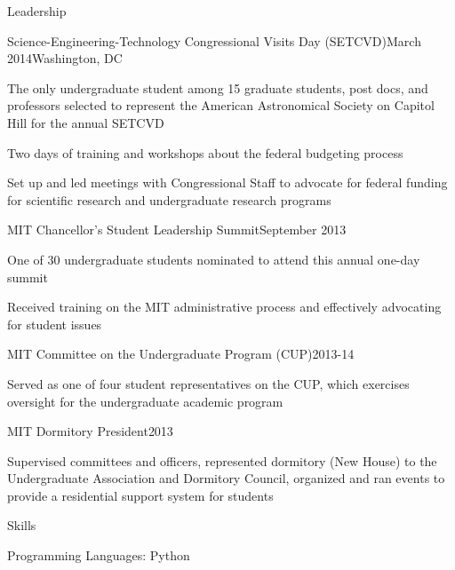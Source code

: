 \documentclass{resume} %
\begin{document}
\begin{rSection}{Leadership}

  \begin{rSubsection}{Science-Engineering-Technology Congressional Visits Day (SETCVD)}{March 2014}{}{Washington, DC}
  \item The only undergraduate student among 15 graduate students, post docs, and professors selected to represent the American Astronomical Society on Capitol Hill for the annual SETCVD
  \item Two days of training and workshops about the federal budgeting process 
  \item Set up and led meetings with Congressional Staff to advocate for federal funding for scientific research and undergraduate research programs
  \end{rSubsection}

\begin{rSubsection}{MIT Chancellor's Student Leadership Summit}{September 2013}{}{}
\item One of 30 undergraduate students nominated to attend this annual one-day summit
\item Received training on the MIT administrative process and effectively advocating for student issues 
\end{rSubsection}

\begin{rSubsection}{MIT Committee on the Undergraduate Program (CUP)}{2013-14}{}{}
\item Served as one of four student representatives on the CUP, which exercises oversight for the undergraduate academic program
\end{rSubsection}

\begin{rSubsection}{MIT Dormitory President}{2013}{}{}
\item Supervised committees and officers, represented dormitory (New House) to the Undergraduate Association and Dormitory Council, organized and ran events to provide a residential support system for students
\end{rSubsection}

\end{rSection}

\begin{rSection}{Skills}
\item Programming Languages: Python
\end{rSection}
\end{document}

